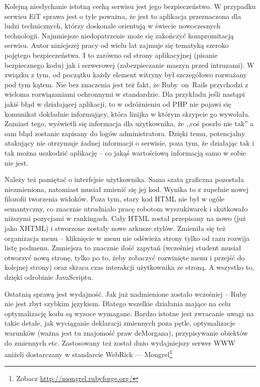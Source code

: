 \documentclass[a4paper,12pt,oneside]{report}
\begin{document}
Kolejną niesłychanie istotną cechą serwisu jest jego bezpieczeństwo. W przypadku serwisu EiT sprawa jest o tyle poważna, że jest to aplikacja przeznaczona dla ludzi technicznych, którzy doskonale orientują w świecie nowoczesnych technologii. Najmniejsze niedopatrzenie może się zakończyć kompromitacją serwisu. Autor niniejszej pracy od wielu lat zajmuje się tematyką szeroko pojętego bezpieczeństwa. I to zarówno od strony aplikacyjnej (pisanie bezpiecznego kodu) jak i serwerowej (zabezpieczanie maszyn przed intruzami). W związku z tym, od początku każdy element witryny był szczegółowo rozważany pod tym kątem. Nie bez znaczenia jest też fakt, że Ruby~on~Rails przychodzi z wieloma rozwiązaniami ochronnymi w standardzie. Dla przykładu jeśli nastąpi jakiś błąd w działającej aplikacji, to w odróżnieniu od PHP nie pojawi się komunikat dokładnie informujący, która linijka w którym skrypcie go wywołała. Zamiast tego, wyświetli się informacja dla użytkownika, że ,,coś poszło nie tak'' a sam błąd zostanie zapisany do logów administratora. Dzięki temu, potencjalny atakujący nie otrzymuje żadnej informacji o serwisie, poza tym, że działając tak i tak można uszkodzić aplikację -- co jakąś wartościową informacją samo w sobie nie jest.

Należy też pamiętać o interfejsie użytkownika. Sama szata graficzna pozostała niezmieniona, natomiast musiał zmienić się jej kod. Wynika to z zupełnie nowej filozofii tworzenia widoków. Poza tym, stary kod HTML nie był w ogóle semantyczny, co znacznie utrudniało pracę robotom wyszukiwarek i skutkowało niższymi pozycjami w rankingach. Cały HTML został przepisany na nowo (już jako XHTML) i stworzone zostały nowe arkusze stylów. Zmieniła się też organizacja menu -- kliknięcie w menu nie odświeża strony tylko od razu rozwija listę podmenu. Zmniejsza to znacznie ilość zapytań (wcześniej student musiał otworzyć nową stronę, tylko po to, żeby zobaczyć rozwinięte menu i przejść do kolejnej strony) oraz skraca czas interakcji użytkownika ze stroną. A wszystko to, dzięki odrobinie JavaScriptu.

Ostatnią sprawą jest wydajność. Jak już nadmienione zostało wcześniej -- Ruby nie jest zbyt szybkim językiem. Dlatego wszelkie działania mające na celu optymalizację kodu są wysoce wymagane. Bardzo istotne jest zwracanie uwagi na takie detale, jak wyciąganie deklaracji zmiennych poza pętle, optymalizacje warunków (ważna jest tu znajomość praw deMorgana), przypisywanie obiektów do zmiennych etc. Zastosowany też został dużo wydajniejszy serwer WWW aniżeli dostarczany w standarcie WebRick --- Mongrel\footnote{Zobacz \url{http://mongrel.rubyforge.org/}}
\end{document}
